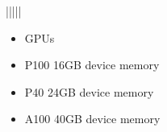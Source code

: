 \documentclass[a4paper,11pt,english]{sphinxmanual}
\begin{document}
\begin{savenotes}
\begin{tabulary}{\linewidth}[t]{|||||}
\begin{itemize}
\item {} 
 GPUs

\item {} 
\sphinxAtStartPar
P100 16GB device memory

\item {} 
\sphinxAtStartPar
P40 24GB device memory

\item {} 
\sphinxAtStartPar
A100 40GB device memory

\end{itemize}
\\
\sphinxbottomrule
\end{tabulary}
\sphinxtableafterendhook\par
\sphinxattableend\end{savenotes}
\end{document}
